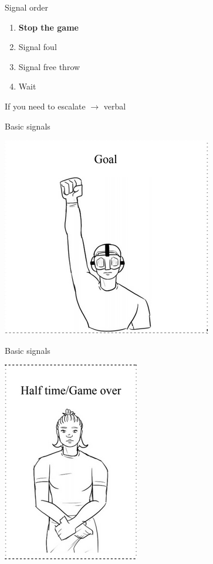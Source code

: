 \begin{frame}{Signal order}
    \begin{enumerate}
        \item \textbf{Stop the game}\pause{}
        \item Signal foul
        \item Signal free throw
        \item Wait
    \end{enumerate}

    \pause{}

    If you need to escalate $\rightarrow$ verbal
\end{frame}

\begin{frame}{Basic signals}
    \begin{center}
        \includegraphics[scale=0.8]{goalScoredSignal}
    \end{center}
\end{frame}

\begin{frame}{Basic signals}
    \begin{center}
        \includegraphics[scale=0.8]{endOfPeriodSignal}
    \end{center}
\end{frame}

